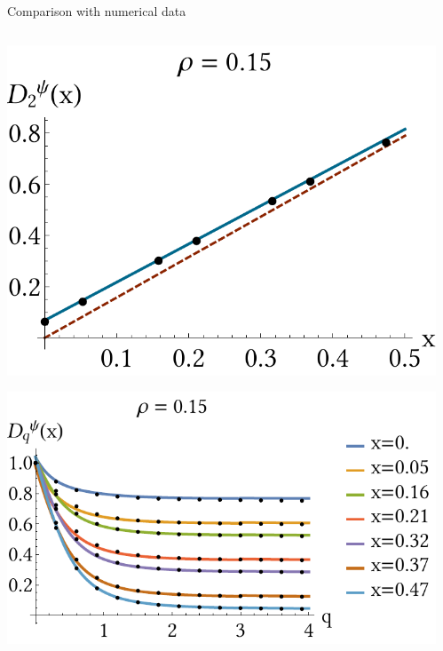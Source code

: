 \documentclass[xcolor=x11names,compress,professionalfonts]{beamer}
\renewcommand{\(}{\begin{columns}}
\renewcommand{\)}{\end{columns}}
\newcommand{\<}[1]{\begin{column}{#1}}
\renewcommand{\>}{\end{column}}
\begin{document}
\begin{frame}{Comparison with numerical data}
\begin{columns}
	\begin{column}{5cm}
		\centering
  		\includegraphics[scale=.4]{local_wf.pdf}
  		
  		\includegraphics[scale=.48]{individual_wf_dimensions.pdf}
	\end{column}
	\begin{column}{6cm}
		

\end{column}
\end{columns}
\end{frame}
\end{document}
